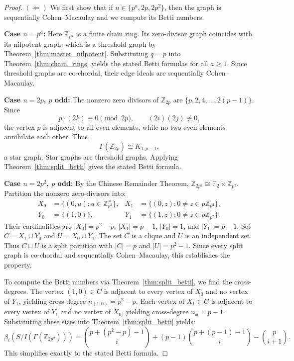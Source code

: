 \documentclass[12pt, reqno]{amsart}
\theoremstyle{definition}
\numberwithin{equation}{section}
\begin{document}
	\begin{proof}
		$(\Longleftarrow)$ We first show that if $n \in \{p^a, 2p, 2p^2\}$, then the graph is sequentially Cohen--Macaulay and we compute its Betti numbers.
		
		\textbf{Case $n=p^a$:}
		Here $\mathbb Z_{p^a}$ is a finite chain ring. Its zero-divisor graph coincides with its nilpotent graph, which is a threshold graph by Theorem~\ref{thm:master_nilpotent}. Substituting $q=p$ into Theorem~\ref{thm:chain_rings} yields the stated Betti formulas for all $a \ge 1$. Since threshold graphs are co-chordal, their edge ideals are sequentially Cohen--Macaulay.
		
		\textbf{Case $n=2p$, $p$ odd:}
		The nonzero zero divisors of $\mathbb Z_{2p}$ are $\{p,2,4,\dots,2(p-1)\}$. Since
		\[
		p \cdot (2k) \equiv 0 \pmod{2p}, \qquad (2i)(2j)\not\equiv 0,
		\]
		the vertex $p$ is adjacent to all even elements, while no two even elements annihilate each other. Thus,
		\[
		\Gamma(\mathbb Z_{2p}) \cong K_{1,p-1},
		\]
		a star graph. Star graphs are threshold graphs. Applying Theorem~\ref{thm:split_betti} gives the stated Betti formula.
		
		\textbf{Case $n=2p^2$, $p$ odd:}
		By the Chinese Remainder Theorem, $\mathbb Z_{2p^2}\cong\mathbb F_2\times\mathbb Z_{p^2}$. Partition the nonzero zero-divisors into:
		\begin{align*}
			X_0&=\{(0,u):u\in\mathbb Z_{p^2}^{\times}\}, & X_1&=\{(0,z):0\ne z\in p\mathbb Z_{p^2}\},\\
			Y_0&=\{(1,0)\}, & Y_1&=\{(1,z):0\ne z\in p\mathbb Z_{p^2}\}.
		\end{align*}
		Their cardinalities are $|X_0|=p^2-p$, $|X_1|=p-1$, $|Y_0|=1$, and $|Y_1|=p-1$.
		Set $C=X_1\cup Y_0$ and $U=X_0\cup Y_1$. The set $C$ is a clique and $U$ is an independent set. Thus $C\sqcup U$ is a split partition with $|C|=p$ and $|U|=p^2-1$. Since every split graph is co-chordal and sequentially Cohen--Macaulay, this establishes the property. 
		
		To compute the Betti numbers via Theorem~\ref{thm:split_betti}, we find the cross-degrees. The vertex $(1,0) \in C$ is adjacent to every vertex of $X_0$ and no vertex of $Y_1$, yielding cross-degree $n_{(1,0)} = p^2-p$. Each vertex of $X_1 \in C$ is adjacent to every vertex of $Y_1$ and no vertex of $X_0$, yielding cross-degree $n_{x} = p-1$. Substituting these sizes into Theorem~\ref{thm:split_betti} yields:
		\[
		\beta_i(S/I(\Gamma(\mathbb Z_{2p^2}))) = \binom{p+(p^2-p)-1}{i} + (p-1)\binom{p+(p-1)-1}{i} - \binom{p}{i+1}.
		\]
		This simplifies exactly to the stated Betti formula.
		

\end{proof}
\end{document}

